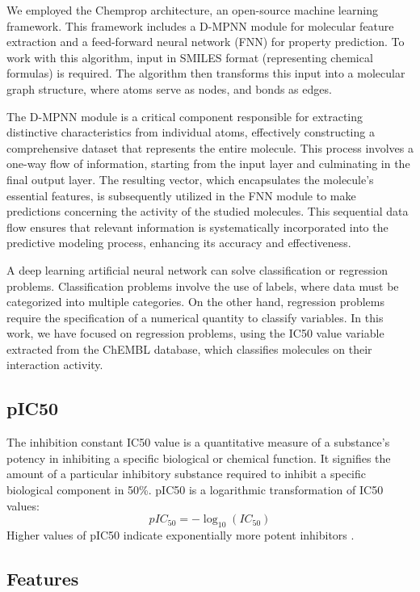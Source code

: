 \documentclass[final,times,twocolumn,article]{elsarticle}
\begin{document}
We employed the Chemprop architecture, an open-source machine learning framework. This framework includes a D-MPNN module for molecular feature extraction and a feed-forward neural network (FNN) for property prediction. To work with this algorithm, input in SMILES format (representing chemical formulas) is required. The algorithm then transforms this input into a molecular graph structure, where atoms serve as nodes, and bonds as edges. 

The D-MPNN module is a critical component responsible for extracting distinctive characteristics from individual atoms, effectively constructing a comprehensive dataset that represents the entire molecule. This process involves a one-way flow of information, starting from the input layer and culminating in the final output layer. The resulting vector, which encapsulates the molecule's essential features, is subsequently utilized in the FNN module to make predictions concerning the activity of the studied molecules. This sequential data flow ensures that relevant information is systematically incorporated into the predictive modeling process, enhancing its accuracy and effectiveness. \cite{Wang2022}

A deep learning artificial neural network can solve classification or regression problems. Classification problems involve the use of labels, where data must be categorized into multiple categories. On the other hand, regression problems require the specification of a numerical quantity to classify variables. In this work, we have focused on regression problems, using the IC50 value variable extracted from the ChEMBL database, which classifies molecules on their interaction activity. 

\subsection{pIC50}

The inhibition constant IC50 value is a quantitative measure of a substance's potency in inhibiting a specific biological or chemical function. It signifies the amount of a particular inhibitory substance required to inhibit a specific biological component in 50\%. pIC50 is a logarithmic transformation of IC50 values: 
\begin{equation}
    pIC_{50} = -\log_{10}(IC_{50})
\end{equation}
Higher values of pIC50 indicate exponentially more potent inhibitors \cite{pic50}.

\subsection{Features}
\end{document}
